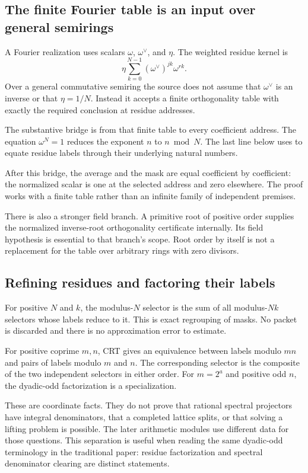 \subsection{The finite Fourier table is an input over general semirings}

A Fourier realization uses scalars $\omega$, $\omega^\vee$, and $\eta$. The weighted residue kernel is
\[
\eta\sum_{k=0}^{N-1}(\omega^\vee)^{jk}\omega^{rk}.
\]
Over a general commutative semiring the source does not assume that $\omega^\vee$ is an inverse or that $\eta=1/N$. Instead it accepts a finite orthogonality table with exactly the required conclusion at residue addresses.

The substantive bridge is from that finite table to every coefficient address. The equation $\omega^N=1$ reduces the exponent $n$ to $n\bmod N$. The last line below uses  to equate residue labels through their underlying natural numbers.

After this bridge, the average and the mask are equal coefficient by coefficient: the normalized scalar is one at the selected address and zero elsewhere. The proof works with a finite table rather than an infinite family of independent premises.

There is also a stronger field branch. A primitive root of positive order supplies the normalized inverse-root orthogonality certificate internally. Its field hypothesis is essential to that branch's scope. Root order by itself is not a replacement for the table over arbitrary rings with zero divisors.

\subsection{Refining residues and factoring their labels}

For positive $N$ and $k$, the modulus-$N$ selector is the sum of all modulus-$Nk$ selectors whose labels reduce to it. This is exact regrouping of masks. No packet is discarded and there is no approximation error to estimate.

For positive coprime $m,n$, CRT gives an equivalence between labels modulo $mn$ and pairs of labels modulo $m$ and $n$. The corresponding selector is the composite of the two independent selectors in either order. For $m=2^a$ and positive odd $n$, the dyadic-odd factorization is a specialization.

These are coordinate facts. They do not prove that rational spectral projectors have integral denominators, that a completed lattice splits, or that solving a lifting problem is possible. The later arithmetic modules use different data for those questions. This separation is useful when reading the same dyadic-odd terminology in the traditional paper: residue factorization and spectral denominator clearing are distinct statements.
